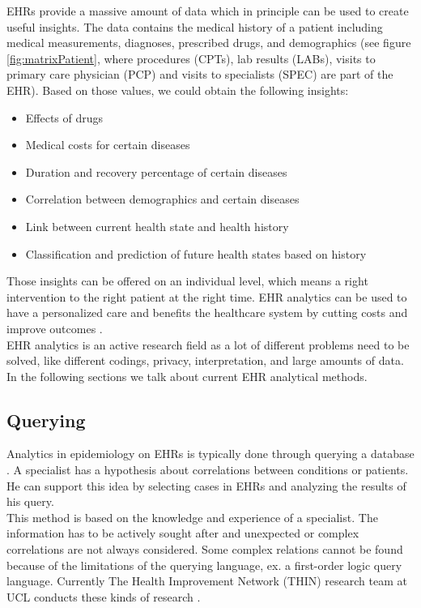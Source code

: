 EHRs provide a massive amount of data which in principle can be used to create useful insights. The data contains the medical history of a patient including medical measurements, diagnoses, prescribed drugs, and demographics (see figure \ref{fig:matrixPatient}, where procedures (CPTs), lab results (LABs), visits to primary care physician (PCP) and visits to specialists (SPEC) are part of the EHR). Based on those values, we could obtain the following insights:

\begin{itemize}

\item Effects of drugs
\item Medical costs for certain diseases
\item Duration and recovery percentage of certain diseases
\item Correlation between demographics and certain diseases
\item Link between current health state and health history
\item Classification and prediction of future health states based on history

\end{itemize}

Those insights can be offered on an individual level, which means a right intervention to the right patient at the right time. EHR analytics can be used to have a personalized care and benefits the healthcare system by cutting costs and improve outcomes \cite{rand1:article}. \\

EHR analytics is an active research field as a lot of different problems need to be solved, like different codings, privacy, interpretation, and large amounts of data. In the following sections we talk about current EHR analytical methods.


\subsection{Querying}

Analytics in epidemiology on EHRs is typically done through querying a database \cite{EHRquery:journal}. A specialist has a hypothesis about correlations between conditions or patients. He can support this idea by selecting cases in EHRs and analyzing the results of his query. \\
This method is based on the knowledge and experience of a specialist. The information has to be actively sought after and unexpected or complex correlations are not always considered. Some complex relations cannot be found because of the limitations of the querying language, ex. a first-order logic query language. Currently The Health Improvement Network (THIN) research team at UCL conducts these kinds of research \cite{THIN:online}.

